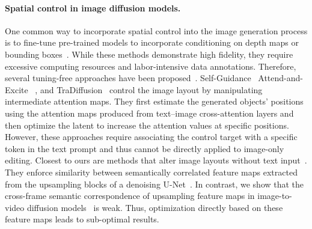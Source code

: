 \paragraph{Spatial control in image diffusion models.}
One common way to incorporate spatial control into the image generation process is to fine-tune pre-trained models to incorporate conditioning on depth maps or bounding boxes~\citep{ControlNet,ye2023ip,SpaText,GLIGEN,PairDiffusion,InstanceDiffusion}.
While these methods demonstrate high fidelity, they require excessive computing resources and labor-intensive data annotations. 
Therefore, several tuning-free approaches have been proposed~\citep{MasaCtrl,LayoutGuidanceAttn1,LayoutGuidanceAttn2,PromptToPrompt}.
Self-Guidance~\citep{epstein2023diffusion} Attend-and-Excite~\citep{chefer2023attend} , and TraDiffusion~\citep{wu2024tradiffusion} control the image layout by manipulating intermediate attention maps. %
They first estimate the generated objects' positions using the attention maps produced from text--image cross-attention layers and then optimize the latent to increase the attention values at specific positions.
However, these approaches require associating the control target with a specific token in the text prompt and thus cannot be directly applied to image-only editing.
Closest to ours are methods that alter image layouts without text input~\citep{pan2023drag,mou2023dragondiffusion,mou2024diffeditor,ling2023freedrag,liu2024drag,zhang2024gooddrag,cui2024stabledrag,hou2024easydrag,zhao2024fastdrag,shi2024dragdiffusion}.
They enforce similarity between semantically correlated feature maps extracted from the upsampling blocks of a denoising U-Net~\citep{tang2023emergent,namekata2024emerdiff,hedlin2024unsupervised,zhang2023tale,luo2023dhf}.
In contrast, we show that the cross-frame semantic correspondence of upsampling feature maps in image-to-video diffusion models~\citep{blattmann2023stable} is weak. Thus, optimization directly based on these feature maps leads to sub-optimal results.


